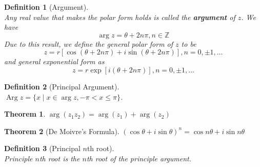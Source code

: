 \documentclass[12pt]{article}
\newtheorem{definition}{Definition}[section]
\newtheorem{theorem}{Theorem}[section]
\theoremstyle{definition}
\DeclareMathOperator{\Arg}{Arg}
\begin{document}
\begin{definition}[Argument]
\hfill\\\normalfont Any real value that makes the polar form holds is called the \textbf{argument} of $z$. We have
\[
\arg z = \theta + 2n\pi, n\in\mathbb{Z}
\]
Due to this result, we define the general polar form of $z$ to be
\[
z=r[\cos(\theta + 2n\pi) + i\sin(\theta+ 2n\pi)], n = 0, \pm 1, \ldots
\]
and general exponential form as
\[
z=r\exp[i(\theta + 2n\pi)], n = 0, \pm 1, \ldots
\]
\end{definition}
\begin{definition}[Principal Argument]
\hfill\\\normalfont $\Arg z = \{x\mid x\in \arg z, -\pi<x\leq \pi\}$.
\end{definition}
\begin{theorem}$\arg(z_1z_2)=\arg(z_1) + \arg(z_2)$\end{theorem}
\begin{theorem}[De Moivre's Formula] $(\cos \theta + i\sin \theta)^n = \cos n\theta + i\sin n\theta$\end{theorem}
\begin{definition}[Principal {$n$}th root]
\hfill\\\normalfont Principle $n$th root is the $n$th root of the principle argument.
\end{definition}
\clearpage
\end{document}
